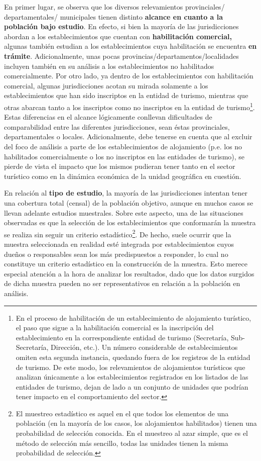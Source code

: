 \documentclass[
]{book}
\begin{document}
En primer lugar, se observa que los diversos relevamientos provinciales/ departamentales/ municipales tienen distinto \textbf{alcance en cuanto a la población bajo estudio}. En efecto, si bien la mayoría de las jurisdicciones abordan a los establecimientos que cuentan con \textbf{habilitación comercial,} algunas también estudian a los establecimientos cuya habilitación se encuentra \textbf{en trámite}. Adicionalmente, unas pocas provincias/departamentos/localidades incluyen también en su análisis a los establecimientos no habilitados comercialmente. Por otro lado, ya dentro de los establecimientos con habilitación comercial, algunas jurisdicciones acotan su mirada solamente a los establecimientos que han sido inscriptos en la entidad de turismo, mientras que otras abarcan tanto a los inscriptos como no inscriptos en la entidad de turismo\footnote{En el proceso de habilitación de un establecimiento de alojamiento turístico, el paso que sigue a la habilitación comercial es la inscripción del establecimiento en la correspondiente entidad de turismo (Secretaría, Sub-Secretaría, Dirección, etc.). Un número considerable de establecimientos omiten esta segunda instancia, quedando fuera de los registros de la entidad de turismo. De este modo, los relevamientos de alojamientos turísticos que analizan únicamente a los establecimientos registrados en los listados de las entidades de turismo, dejan de lado a un conjunto de unidades que podrían tener impacto en el comportamiento del sector.}. Estas diferencias en el alcance lógicamente conllevan dificultades de comparabilidad entre las diferentes jurisdicciones, sean éstas provinciales, departamentales o locales. Adicionalmente, debe tenerse en cuenta que al excluir del foco de análisis a parte de los establecimientos de alojamiento (p.e. los no habilitados comercialmente o los no inscriptos en las entidades de turismo), se pierde de vista el impacto que los mismos pudieran tener tanto en el sector turístico como en la dinámica económica de la unidad geográfica en cuestión.

En relación al \textbf{tipo de estudio}, la mayoría de las jurisdicciones intentan tener una cobertura total (censal) de la población objetivo, aunque en muchos casos se llevan adelante estudios muestrales. Sobre este aspecto, una de las situaciones observadas es que la selección de los establecimientos que conformarán la muestra se realiza sin seguir un criterio estadístico\footnote{El muestreo estadístico es aquel en el que todos los elementos de una población (en la mayoría de los casos, los alojamientos habilitados) tienen una probabilidad de selección conocida. En el muestreo al azar simple, que es el método de selección más sencillo, todas las unidades tienen la misma probabilidad de selección.}. De hecho, suele ocurrir que la muestra seleccionada en realidad esté integrada por establecimientos cuyos dueños o responsables sean los más predispuestos a responder, lo cual no constituye un criterio estadístico en la construcción de la muestra. Esto merece especial atención a la hora de analizar los resultados, dado que los datos surgidos de dicha muestra pueden no ser representativos en relación a la población en análisis.
\end{document}
